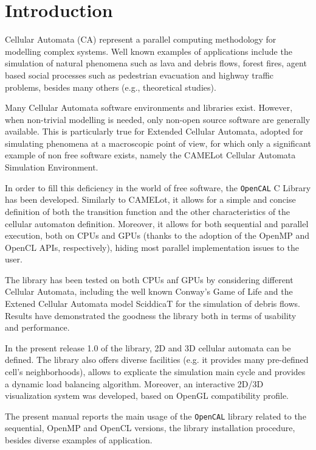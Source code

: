 \chapter{Introduction}

Cellular Automata (CA) represent a parallel computing
methodology for modelling
complex systems. Well known
examples of applications include the simulation of natural phenomena
such as lava and debris flows, forest fires, agent based social
processes such as pedestrian evacuation and highway traffic problems,
besides many others (e.g., theoretical studies).

Many Cellular Automata software environments and libraries exist.
However, when non-trivial modelling is needed, only non-open source
software are generally available. This is particularly true for
Extended Cellular Automata, adopted for simulating phenomena at a macroscopic point of view, for which only a significant example of
non free software exists, namely the CAMELot Cellular Automata
Simulation Environment.

In order to fill this deficiency in the world of free software, the
\verb'OpenCAL' C Library has been developed. Similarly to CAMELot, it
allows for a simple and concise definition of both the transition
function and the other characteristics of the cellular automaton
definition. Moreover, it allows for both sequential and parallel
execution, both on CPUs and GPUs (thanks to the adoption of the OpenMP
and OpenCL APIs, respectively), hiding most parallel implementation issues
to the user.

The library has been tested on both CPUs anf GPUs by considering
different Cellular Automata, including the well known Conway's Game of
Life and the Extened Cellular Automata model SciddicaT for the
simulation of debris flows. Results have demonstrated the goodness the
library both in terms of usability and performance.

In the present release 1.0 of the library, 2D and 3D cellular automata
can be defined. The library also offers diverse facilities (e.g. it
provides many pre-defined cell's neighborhoods), allows to explicate
the simulation main cycle and provides a dynamic load balancing
algorithm. Moreover, an interactive 2D/3D visualization system was
developed, based on OpenGL compatibility profile.

The present manual reports the main usage of the \verb'OpenCAL' library related to 
the sequential, OpenMP and OpenCL versions, the library installation procedure, besides diverse examples of application. 
